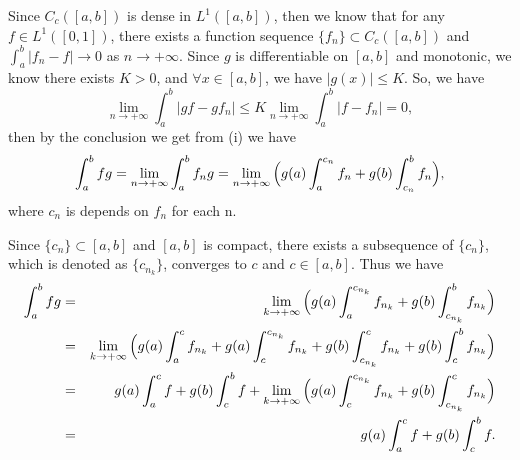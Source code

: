 \documentclass[12pt,a4paper]{ctexart}
\begin{document}
Since $C_{c}([a, b])$ is dense in $L^{1}([a, b])$, then we know that for any $f \in L^{1}([0, 1])$, there exists a function sequence $\{f_{n}\} \subset C_{c}([a, b])$ and $\int_{a}^{b} |f_{n} - f| \to 0$ as $n \to + \infty$.
Since $g$ is differentiable on $[a,b]$ and monotonic, we know there exists $K > 0$, and $\forall x \in [a, b]$, we have $|g(x)| \leq K$. So, we have
\begin{equation*}
   \lim_{n \to + \infty} \int_{a}^{b} |g f - g f_{n}| \leq K \lim_{n \to + \infty} \int_{a}^{b}|f - f_{n}| = 0,
\end{equation*}
then by the conclusion we get from (i) we have
\begin{equation*}
   \int_{a}^{b} f g = \lim_{n \to + \infty} \int_{a}^{b} f_{n} g = \lim_{n \to + \infty} \Big{(} g(a) \int_{a}^{c_{n}} f_{n} + g(b) \int_{c_{n}}^{b} f_{n} \Big{)},
\end{equation*}
where $c_{n}$ is depends on $f_{n}$ for each n.

Since $\{c_{n}\} \subset [a, b]$ and $[a, b]$ is compact, there exists a subsequence of $\{c_{n}\}$, which is denoted as $\{c_{n_{k}}\}$, converges to $c$ and $c \in [a, b]$. Thus we have
\begin{eqnarray*}
\int_{a}^{b} f g & = & \lim_{k \to + \infty} \Big{(} g(a) \int_{a}^{c_{n_{k}}} f_{n_{k}} + g(b) \int_{c_{n_{k}}}^{b} f_{n_{k}} \Big{)} \\
& = & \lim_{k \to + \infty} \Big{(} g(a) \int_{a}^{c} f_{n_{k}} + g(a) \int_{c}^{c_{n_{k}}} f_{n_{k}} + g(b) \int_{c_{n_{k}}}^{c} f_{n_{k}} + g(b) \int_{c}^{b} f_{n_{k}} \Big{)} \\
& = &  g(a) \int_{a}^{c} f + g(b) \int_{c}^{b} f + \lim_{k \to + \infty} \Big{(} g(a) \int_{c}^{c_{n_{k}}} f_{n_{k}} +  g(b) \int_{c_{n_{k}}}^{c} f_{n_{k}} \Big{)} \\
& = & g(a) \int_{a}^{c} f + g(b) \int_{c}^{b} f.
\end{eqnarray*}
\end{document}
